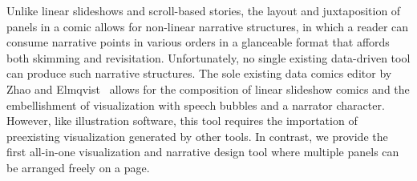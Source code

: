 Unlike linear slideshows and scroll-based stories, the layout and juxtaposition of panels in a comic allows for non-linear narrative structures, in which a reader can consume narrative points in various orders in a glanceable format that affords both skimming and revisitation.
Unfortunately, no single existing data-driven tool can produce such narrative structures. 
The sole existing data comics editor by Zhao and Elmqvist~\cite{zhao2015data} allows for the composition of linear slideshow comics and the embellishment of visualization with speech bubbles and a narrator character. However, like illustration software, this tool requires the importation of preexisting visualization generated by other tools. 
In contrast, we provide the first all-in-one visualization and narrative design tool where multiple panels can be arranged freely on a page.



